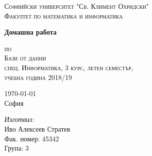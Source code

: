 \documentclass[a4paper, 12pt, x11names]{article}
\newcommand{\univname}{Софиийски университет "Св. Климент Охридски"\\Факултет по математика и информатика}
\begin{document}
\begin{titlepage}
\begin{center}
    
\vspace*{.06\textheight}
{\scshape\large \univname\par}\vspace{1.5cm}

{\huge \bfseries{Домашна работа}\par}\vspace{0.7cm}
\textsc{\small по}\\[0.6cm]
\textsc{\Large Бази от данни}\\[0.5cm]
\textsc{\normalsize спец. Информатика, 3 курс, летен семестър,}\\[0.5cm]
\textsc{\normalsize учебна година 2018/19}\\[2cm]
     
\begin{minipage}[t]{0.4\textwidth}
\begin{flushleft} \large
{\large \today}\\[1cm]
София
\end{flushleft}
\end{minipage}
\begin{minipage}[t]{0.4\textwidth}
\begin{flushright} \large
\emph{Изготвил:}\\[0.5cm]
Иво Алексеев Стратев\\[0.5cm]
Фак. номер: 45342\\[0.2cm]
Група: 3
\end{flushright}
\end{minipage}
\end{center}
\end{titlepage}
\end{document}
